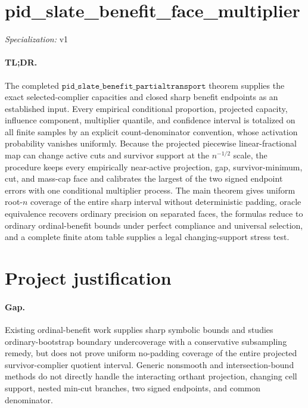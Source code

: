 \documentclass{article}
\begin{document}
\sloppy

\section*{pid\_\allowbreak{}slate\_\allowbreak{}benefit\_\allowbreak{}face\_\allowbreak{}multiplier}

\noindent\textit{Specialization:} v1\par

\paragraph{TL;DR.} The completed \(\texttt{pid\_slate\_benefit\_partialtransport}\) theorem supplies the exact selected-complier capacities and closed sharp benefit endpoints as an established input. Every empirical conditional proportion, projected capacity, influence component, multiplier quantile, and confidence interval is totalized on all finite samples by an explicit count-denominator convention, whose activation probability vanishes uniformly. Because the projected piecewise linear-fractional map can change active cuts and survivor support at the \(n^{-1/2}\) scale, the procedure keeps every empirically near-active projection, gap, survivor-minimum, cut, and mass-cap face and calibrates the largest of the two signed endpoint errors with one conditional multiplier process. The main theorem gives uniform root-\(n\) coverage of the entire sharp interval without deterministic padding, oracle equivalence recovers ordinary precision on separated faces, the formulas reduce to ordinary ordinal-benefit bounds under perfect compliance and universal selection, and a complete finite atom table supplies a legal changing-support stress test.

\section{Project justification}

\paragraph{Gap.} Existing ordinal-benefit work supplies sharp symbolic bounds and studies ordinary-bootstrap boundary undercoverage with a conservative subsampling remedy, but does not prove uniform no-padding coverage of the entire projected survivor-complier quotient interval. Generic nonsmooth and intersection-bound methods do not directly handle the interacting orthant projection, changing cell support, nested min-cut branches, two signed endpoints, and common denominator.
\end{document}
